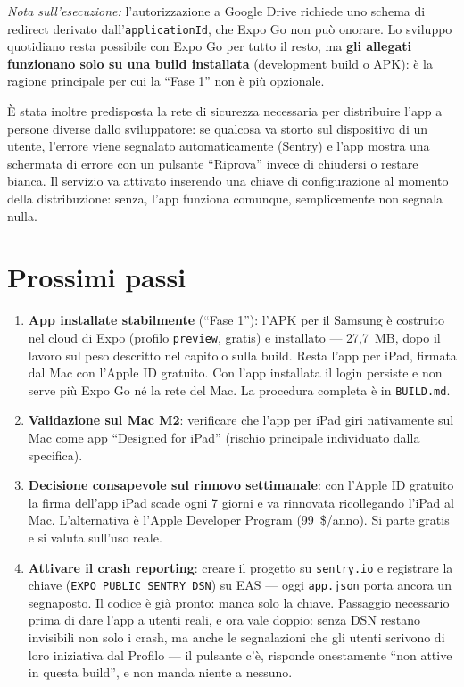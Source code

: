 \documentclass[11pt,a4paper]{report}
\begin{document}
\emph{Nota sull'esecuzione:} l'autorizzazione a Google Drive richiede uno
schema di redirect derivato dall'\texttt{applicationId}, che Expo Go non pu\`o
onorare. Lo sviluppo quotidiano resta possibile con Expo Go per tutto il
resto, ma \textbf{gli allegati funzionano solo su una build installata}
(development build o APK): \`e la ragione principale per cui la ``Fase 1'' non
\`e pi\`u opzionale.

\`E stata inoltre predisposta la rete di sicurezza necessaria per distribuire
l'app a persone diverse dallo sviluppatore: se qualcosa va storto sul
dispositivo di un utente, l'errore viene segnalato automaticamente (Sentry) e
l'app mostra una schermata di errore con un pulsante ``Riprova'' invece di
chiudersi o restare bianca. Il servizio va attivato inserendo una chiave di
configurazione al momento della distribuzione: senza, l'app funziona
comunque, semplicemente non segnala nulla.

\section{Prossimi passi}

\begin{enumerate}[nosep]
  \item \textbf{App installate stabilmente} (``Fase 1''): l'APK per il Samsung
        \`e costruito nel cloud di Expo (profilo \texttt{preview}, gratis) e
        installato --- 27,7~MB, dopo il lavoro sul peso descritto nel capitolo
        sulla build. Resta l'app per iPad, firmata dal Mac con l'Apple ID
        gratuito. Con l'app installata il login persiste e non serve pi\`u Expo
        Go n\'e la rete del Mac. La procedura completa \`e in \texttt{BUILD.md}.
  \item \textbf{Validazione sul Mac M2}: verificare che l'app per iPad giri
        nativamente sul Mac come app ``Designed for iPad'' (rischio
        principale individuato dalla specifica).
  \item \textbf{Decisione consapevole sul rinnovo settimanale}: con l'Apple
        ID gratuito la firma dell'app iPad scade ogni 7 giorni e va
        rinnovata ricollegando l'iPad al Mac. L'alternativa \`e l'Apple
        Developer Program (99~\$/anno). Si parte gratis e si valuta
        sull'uso reale.
  \item \textbf{Attivare il crash reporting}: creare il progetto su
        \texttt{sentry.io} e registrare la chiave
        (\texttt{EXPO\_PUBLIC\_SENTRY\_DSN}) su EAS --- oggi
        \texttt{app.json} porta ancora un segnaposto. Il codice \`e gi\`a
        pronto: manca solo la chiave. Passaggio necessario prima di dare
        l'app a utenti reali, e ora vale doppio: senza DSN restano invisibili
        non solo i crash, ma anche le segnalazioni che gli utenti scrivono di
        loro iniziativa dal Profilo --- il pulsante c'\`e, risponde
        onestamente ``non attive in questa build'', e non manda niente a
        nessuno.
\end{enumerate}
\end{document}

